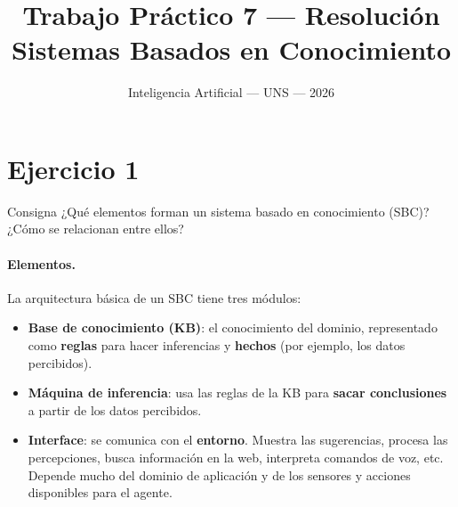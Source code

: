 \documentclass[11pt,a4paper]{article}
\title{\vspace{-1.5cm}\textbf{Trabajo Práctico 7 --- Resolución}\\[3pt]
\large Sistemas Basados en Conocimiento}
\author{\normalsize Inteligencia Artificial --- UNS --- 2026}
\date{}
\begin{document}
\maketitle
\vspace{-1cm}
\notafuentes

\indice

\section{Ejercicio 1}

\begin{enunciado}{Consigna}
¿Qué elementos forman un sistema basado en conocimiento (SBC)? ¿Cómo se relacionan entre ellos?
\end{enunciado}

\paragraph{Elementos.} La arquitectura básica de un SBC tiene tres módulos:
\begin{itemize}
  \item \textbf{Base de conocimiento (KB)}: el conocimiento del dominio, representado como \textbf{reglas} para hacer inferencias y \textbf{hechos} (por ejemplo, los datos percibidos).
  \item \textbf{Máquina de inferencia}: usa las reglas de la KB para \textbf{sacar conclusiones} a partir de los datos percibidos.
  \item \textbf{Interface}: se comunica con el \textbf{entorno}. Muestra las sugerencias, procesa las percepciones, busca información en la web, interpreta comandos de voz, etc. Depende mucho del dominio de aplicación y de los sensores y acciones disponibles para el agente.
\end{itemize}
\end{document}
